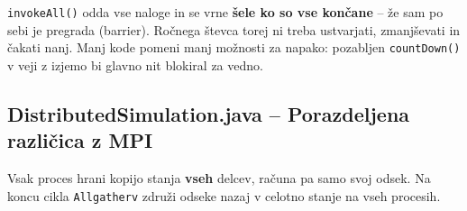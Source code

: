 \documentclass[11pt,a4paper]{article}
\begin{document}
\begin{tcolorbox}[colback=blue!5!white, colframe=blue!75!black, title=Zakaj invokeAll namesto CountDownLatch]
\texttt{invokeAll()} odda vse naloge in se vrne \textbf{\v{s}ele ko so vse kon\v{c}ane} -- \v{z}e sam po sebi je pregrada (barrier). Ro\v{c}nega \v{s}tevca torej ni treba ustvarjati, zmanj\v{s}evati in \v{c}akati nanj. Manj kode pomeni manj mo\v{z}nosti za napako: pozabljen \texttt{countDown()} v veji z izjemo bi glavno nit blokiral za vedno.
\end{tcolorbox}

\subsection{DistributedSimulation.java -- Porazdeljena različica z MPI}
Vsak proces hrani kopijo stanja \textbf{vseh} delcev, ra\v{c}una pa samo svoj odsek. Na koncu cikla \texttt{Allgatherv} zdru\v{z}i odseke nazaj v celotno stanje na vseh procesih.
\end{document}
